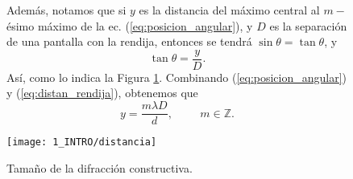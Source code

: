 \documentclass[12pt,a4paper]{article}
\begin{document}
\begin{figure}[hbtp!]
	\begin{minipage}{0.5\linewidth}
		Además, notamos que si 
		\(y\) es la distancia del máximo central al \(m-\)ésimo máximo de la ec. (\ref{eq:posicion_angular}), y \(D\) es la separación de una pantalla con la rendija, entonces se tendrá \(\sin \theta = \tan \theta\), y
		\begin{equation}
			\tan \theta = \dfrac{y}{D}.
			\label{eq:distan_rendija}
		\end{equation}
		Así, como lo indica la Figura \ref{fig:constructiva}. Combinando (\ref{eq:posicion_angular}) y (\ref{eq:distan_rendija}), obtenemos que
		\begin{equation}
			y = \dfrac{m \lambda D}{d} , \hspace{1cm} m \in \mathds{Z} .
			\label{eq:altura}
		\end{equation}
	\end{minipage}\hspace{5mm}
	\begin{minipage}{0.5\linewidth}
		\centering
		\texttt{[image: 1\_INTRO/distancia]}
		\caption{Tamaño de la difracción constructiva.}
		\label{fig:constructiva}
	\end{minipage}
\end{figure}
\end{document}
